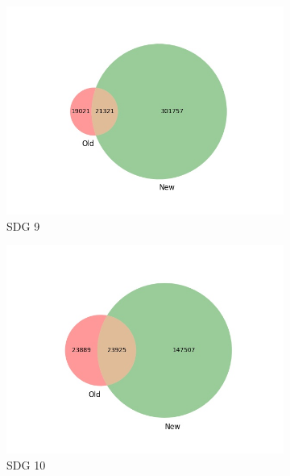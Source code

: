 \documentclass{article}
\begin{document}
\begin{figure}[H]
\begin{subfigure}{0.24\textwidth}
        \includegraphics[width=\textwidth]{figures/aurora-elsevier-venn/venn_sdg_9.jpg}
	    \caption{SDG 9}
    \end{subfigure}
    \hfill
    \begin{subfigure}{0.24\textwidth}
        \centering
        \includegraphics[width=\textwidth]{figures/aurora-elsevier-venn/venn_sdg_10.jpg}
	    \caption{SDG 10}
    \end{subfigure}
    \hfill
    \begin{subfigure}{0.24\textwidth}
        \centering

\end{subfigure}
\end{figure}
\end{document}
